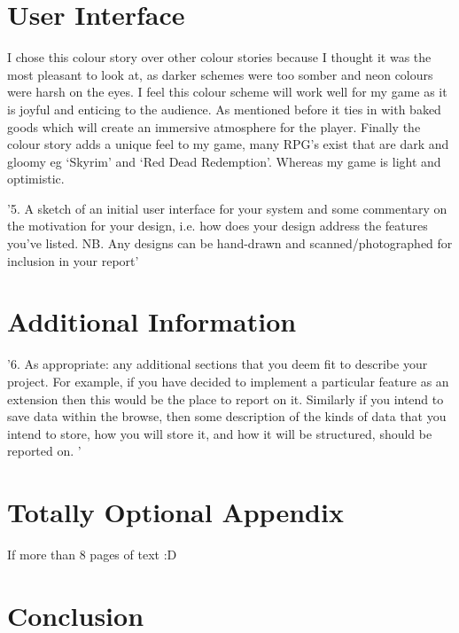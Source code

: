 \documentclass[10pt, a4paper]{article}
\begin{document}
    \section{User Interface}
    I chose this colour story over other colour stories because I thought it was the most pleasant to look at, as darker schemes were too somber and neon colours were harsh on the eyes. I feel this colour scheme will work well for my game as it is joyful and enticing to the audience. As mentioned before it ties in with baked goods which will create an immersive atmosphere for the player. Finally the colour story adds a unique feel to my game, many RPG’s exist that are dark and gloomy eg ‘Skyrim’ and ‘Red Dead Redemption’. Whereas my game is light and optimistic.
	
    '5. A sketch of an initial user interface for your system and some commentary on
    the motivation for your design, i.e. how does your design address the features
    you’ve listed. NB. Any designs can be hand-drawn and scanned/photographed for
    inclusion in your report'
    
    \section{Additional Information}
    '6. As appropriate: any additional sections that you deem fit to describe your
    project. For example, if you have decided to implement a particular feature as
    an extension then this would be the place to report on it. Similarly if you intend
    to save data within the browse, then some description of the kinds of data that
    you intend to store, how you will store it, and how it will be structured, should
    be reported on. '

    \section{Totally Optional Appendix}
    If more than 8 pages of text :D

\section{Conclusion}	


		
\end{document}
